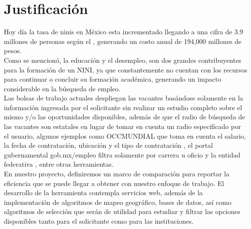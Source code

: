\section{Justificación}

Hoy día la tasa de ninis en México esta incrementado llegando a una cifra de 3.9 millones de personas según el \cite{INEGI} \cite{OECD2}, generando un costo anual de 194,000 millones de pesos.\\

Como se mencionó, la educación y el desempleo, son dos grandes contribuyentes para la formación de un NINI, ya que constantemente no cuentan con los recursos para continuar o concluir su formación académica, generando un impacto considerable en la búsqueda de empleo.\\

Las bolsas de trabajo actuales despliegan las vacantes basándose solamente en la información ingresada por el solicitante sin realizar un estudio completo sobre el mismo y/o las oportunidades disponibles, además de que el radio de búsqueda de las vacantes son estatales en lugar de tomar en cuenta un radio especificado por el usuario, algunos ejemplos como OCCMUNDIAL que toma en cuenta el salario, la fecha de contratación, ubicación y el tipo de contratación \cite{OCC_Blog}, el portal  gubernamental gob.mx/empleo  filtra solamente por carrera u oficio y la entidad federativa \cite{OCC_Busqueda}, entre otras herramientas. \\
 
 En nuestro proyecto, definiremos un marco de comparación para reportar la eficiencia que se puede llegar a obtener con nuestro enfoque de trabajo. 
El desarrollo de la herramienta contempla servicios web, además de la implementación de algoritmos de mapeo geográfico, bases de datos, así como algoritmos de selección que serán de utilidad para estudiar y filtrar las opciones disponibles tanto para el solicitante como para las instituciones. \\
 

 \bigskip


